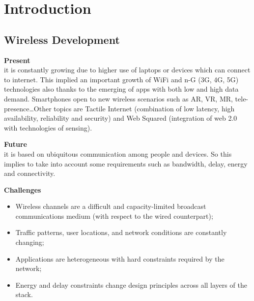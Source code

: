 \section{Introduction}
\subsection{Wireless Development}

\textbf{Present}\\ it is constantly growing
due to higher use of laptops or devices which can
connect to internet. This implied an
important growth of WiFi and n-G (3G, 4G, 5G)
technologies also thanks to the emerging of
apps with both low and high data demand.
Smartphones open to new wireless scenarios such as
AR, VR, MR, tele-presence\dots Other topics are
Tactile Internet (combination of low latency, high
availability, reliability and security) and Web
Squared (integration of web 2.0 with technologies of
sensing).

\textbf{Future}\\ it is based on ubiquitous
communication among people and devices. So this implies
to take into account some requirements such as 
bandwidth, delay, energy and connectivity.

\textbf{Challenges}
\begin{itemize}
    \item Wireless channels are a difficult and
    capacity-limited broadcast communications medium
    (with respect to the wired counterpart);
    \item Traffic patterns, user locations, and network
    conditions are constantly changing;
    \item Applications are heterogeneous with hard
    constraints required by the network;
    \item Energy and delay constraints change design
    principles across all layers of the stack.
\end{itemize}

